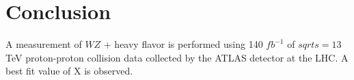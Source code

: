 \documentclass[NOTE, atlasdraft=true, texlive=2016, UKenglish]{\ATLASLATEXPATH atlasdoc}
\begin{document}







\section{Conclusion}
\label{sec:conclusion}

A measurement of $WZ$ + heavy flavor is performed using 140 $fb^{-1}$ of $sqrt{s} = 13$ TeV proton-proton collision data collected by the ATLAS detector at the LHC. A best fit value of X is observed.   

\printbibliography
%
%
\end{document}
